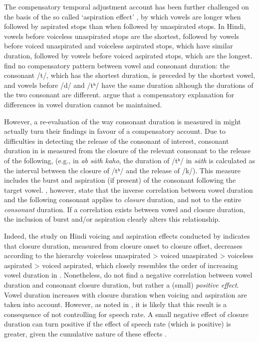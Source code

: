 \documentclass[preprint]{JASAnew}
\begin{document}
The compensatory temporal adjustment account has been further challenged
on the basis of the so called `aspiration effect' \citep{maddieson1976},
by which vowels are longer when followed by aspirated stops than when
followed by unaspirated stops. In Hindi, vowels before voiceless
unaspirated stops are the shortest, followed by vowels before voiced
unaspirated and voiceless aspirated stops, which have similar duration,
followed by vowels before voiced aspirated stops, which are the longest.
\citet{maddieson1976} find no compensatory pattern between vowel and
consonant duration: the consonant /t/, which has the shortest duration,
is preceded by the shortest vowel, and vowels before /d/ and /tʰ/ have
the same duration although the durations of the two consonant are
different. \citet{maddieson1976} argue that a compensatory explanation
for differences in vowel duration cannot be maintained.

However, a re-evaluation of the way consonant duration is measured in
\citet{maddieson1976} might actually turn their findings in favour of a
compensatory account. Due to difficulties in detecting the release of
the consonant of interest, consonant duration in \citet{maddieson1976}
is measured from the closure of the relevant consonant to the release of
the following, (e.g., in \emph{ab sāth kaho}, the duration of /tʰ/ in
\emph{sāth} is calculated as the interval between the closure of /tʰ/
and the release of /k/). This measure includes the burst and aspiration
(if present) of the consonant following the target vowel.
\citet{slis1969a}, however, state that the inverse correlation between
vowel duration and the following consonant applies to \emph{closure}
duration, and not to the entire \emph{consonant} duration. If a
correlation exists between vowel and closure duration, the inclusion of
burst and/or aspiration clearly alters this relationship.

Indeed, the study on Hindi voicing and aspiration effects conducted by
\citet{durvasula2012} indicates that closure duration, measured from
closure onset to closure offset, decreases according to the hierarchy
voiceless unaspirated \textgreater{} voiced unaspirated \textgreater{}
voiceless aspirated \textgreater{} voiced aspirated, which closely
resembles the order of increasing vowel duration in
\citet{maddieson1976}. Nonetheless, \citet{durvasula2012} do not find a
negative correlation between vowel duration and consonant closure
duration, but rather a (small) \emph{positive effect}. Vowel duration
increases with closure duration when voicing and aspiration are taken
into account. However, as noted in \citet{begus2017}, it is likely that
this result is a consequence of not controlling for speech rate. A small
negative effect of closure duration can turn positive if the effect of
speech rate (which is positive) is greater, given the cumulative nature
of these effects \citep[p. 2177]{begus2017}.
\end{document}
